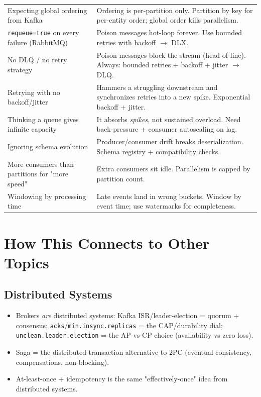 \documentclass[11pt]{article}
\providecommand{\tightlist}{\setlength{\itemsep}{1pt}\setlength{\parskip}{0pt}}
\begin{document}
\begin{longtable}[]{@{}
  >{\raggedright\arraybackslash}p{}
  >{\raggedright\arraybackslash}p{}@{}}
Expecting global ordering from Kafka & Ordering is per-partition only. Partition by key for per-entity order; global order kills parallelism. \\
\rowcolor{zebra}
\texttt{requeue=true} on every failure (RabbitMQ) & Poison messages hot-loop forever. Use bounded retries with backoff \(\rightarrow\) DLX. \\
No DLQ / no retry strategy & Poison messages block the stream (head-of-line). Always: bounded retries + backoff + jitter \(\rightarrow\) DLQ. \\
\rowcolor{zebra}
Retrying with no backoff/jitter & Hammers a struggling downstream and synchronizes retries into a new spike. Exponential backoff + jitter. \\
Thinking a queue gives infinite capacity & It absorbs \emph{spikes}, not sustained overload. Need back-pressure + consumer autoscaling on lag. \\
\rowcolor{zebra}
Ignoring schema evolution & Producer/consumer drift breaks deserialization. Schema registry + compatibility checks. \\
More consumers than partitions for "more speed" & Extra consumers sit idle. Parallelism is capped by partition count. \\
\rowcolor{zebra}
Windowing by processing time & Late events land in wrong buckets. Window by event time; use watermarks for completeness. \\
\end{longtable}

\section{How This Connects to Other Topics}\label{how-this-connects-to-other-topics}

\subsection{Distributed Systems}\label{distributed-systems}

\begin{itemize}
\tightlist
\item
  Brokers \emph{are} distributed systems: Kafka ISR/leader-election = quorum + consensus; \texttt{acks}/\texttt{min.insync.replicas} = the CAP/durability dial; \texttt{unclean.leader.election} = the AP-vs-CP choice (availability vs zero loss).
\item
  Saga = the distributed-transaction alternative to 2PC (eventual consistency, compensations, non-blocking).
\item
  At-least-once + idempotency is the same "effectively-once" idea from distributed systems.
\end{itemize}
\end{document}
